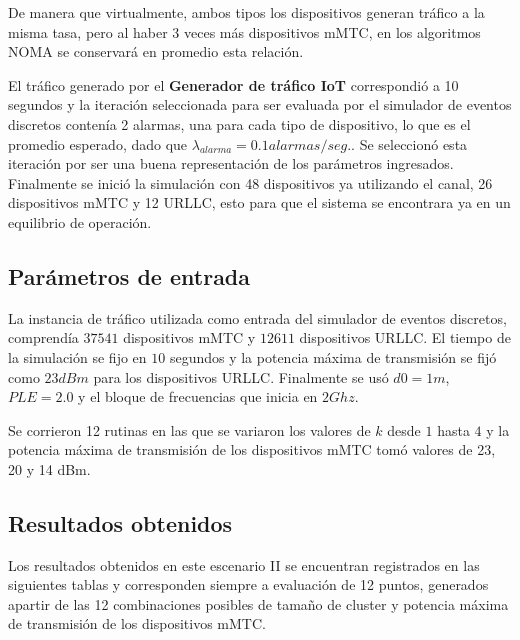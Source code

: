 De manera que virtualmente, ambos tipos los dispositivos generan tráfico a la misma tasa, pero al haber 3 veces más dispositivos mMTC, en los algoritmos NOMA se conservará en promedio esta relación.\newline

El tráfico generado por el \textbf{Generador de tráfico IoT} correspondió a 10 segundos y la iteración seleccionada para ser evaluada por el simulador de eventos discretos contenía 2 alarmas, una para cada tipo de dispositivo, lo que es el promedio esperado, dado que $\lambda_{alarma} = 0.1 alarmas/seg.$. Se seleccionó esta iteración por ser una buena representación de los parámetros ingresados. Finalmente se inició la simulación con 48 dispositivos ya utilizando el canal, 26 dispositivos mMTC y 12 URLLC, esto para que el sistema se encontrara ya en un equilibrio de operación.

\subsection{Parámetros de entrada}

La instancia de tráfico utilizada como entrada del simulador de eventos discretos, comprendía $37541$ dispositivos mMTC y $12611$ dispositivos URLLC. El tiempo de la simulación se fijo en $10$ segundos y la potencia máxima de transmisión se fijó como $23dBm$ para los dispositivos URLLC. Finalmente se usó $d0=1m$, $PLE=2.0$ y el bloque de frecuencias que inicia en $2Ghz$. 

Se corrieron 12 rutinas en las que se variaron los valores de $k$ desde $1$ hasta $4$ y la potencia máxima de transmisión de los dispositivos mMTC tomó valores de 23, 20 y 14 dBm.

\subsection{Resultados obtenidos}

Los resultados obtenidos en este escenario II se encuentran registrados en las siguientes tablas y corresponden siempre a evaluación de 12 puntos, generados apartir de las 12 combinaciones posibles de tamaño de cluster y potencia máxima de transmisión de los dispositivos mMTC. \newline

